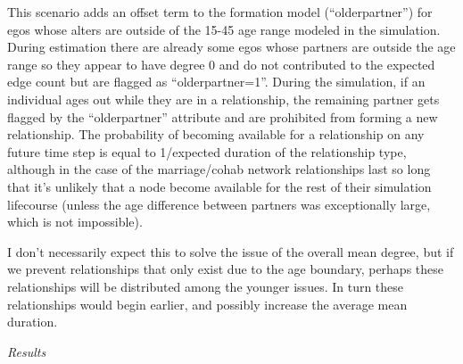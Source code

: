 \documentclass [11pt, proquest] {uwthesis}[2015/03/03]
\begin{document}
This scenario adds an offset term to the formation model
(``olderpartner'') for egos whose alters are outside of the 15-45 age
range modeled in the simulation. During estimation there are already
some egos whose partners are outside the age range so they appear to
have degree 0 and do not contributed to the expected edge count but are
flagged as ``olderpartner=1''. During the simulation, if an individual
ages out while they are in a relationship, the remaining partner gets
flagged by the ``olderpartner'' attribute and are prohibited from
forming a new relationship. The probability of becoming available for a
relationship on any future time step is equal to 1/expected duration of
the relationship type, although in the case of the marriage/cohab
network relationships last so long that it's unlikely that a node become
available for the rest of their simulation lifecourse (unless the age
difference between partners was exceptionally large, which is not
impossible).

I don't necessarily expect this to solve the issue of the overall mean
degree, but if we prevent relationships that only exist due to the age
boundary, perhaps these relationships will be distributed among the
younger issues. In turn these relationships would begin earlier, and
possibly increase the average mean duration.

\emph{Results}
\end{document}
